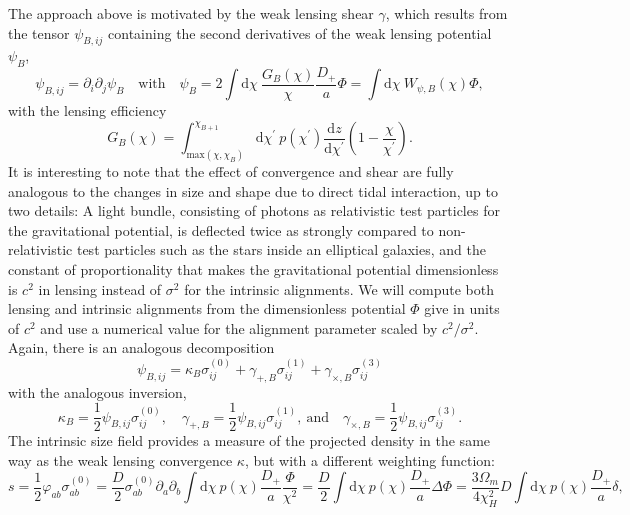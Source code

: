 \documentclass[a4paper,fleqn,usenatbib]{mnras}
\newcommand{\dd}{\mathrm{d}}
\begin{document}
The approach above is motivated by the weak lensing shear $\gamma$, which results from the tensor $\psi_{B,ij}$ containing the second derivatives of the weak lensing potential $\psi_B$,
\begin{equation}
\psi_{B,ij} = \partial_i\partial_j\psi_B
\quad\mathrm{with}\quad
\psi_B = 2\int\dd\chi\:\frac{G_B(\chi)}{\chi}\frac{D_+}{a}\Phi = \int\dd\chi\:W_{\psi,B}(\chi)\Phi,
\end{equation}
with the lensing efficiency
\begin{equation}
G_B(\chi) = \int_{\mathrm{max}(\chi,\chi_B)}^{\chi_{B+1}}\dd\chi^\prime\:p(\chi^\prime)\frac{\dd z}{\dd\chi^\prime}\left(1-\frac{\chi}{\chi^\prime}\right).
\end{equation}
It is interesting to note that the effect of convergence and shear are fully analogous to the changes in size and shape due to direct tidal interaction, up to two details: A light bundle, consisting of photons as relativistic test particles for the gravitational potential, is deflected twice as strongly compared to non-relativistic test particles such as the stars inside an elliptical galaxies, and the constant of proportionality that makes the gravitational potential dimensionless is $c^2$ in lensing instead of $\sigma^2$ for the intrinsic alignments. We will compute both lensing and intrinsic alignments from the dimensionless potential $\Phi$ give in units of $c^2$ and use a numerical value for the alignment parameter scaled by $c^2/\sigma^2$. Again, there is an analogous decomposition
\begin{equation}
\psi_{B,ij} = \kappa_B\sigma^{(0)}_{ij} + \gamma_{+,B}\sigma^{(1)}_{ij} +\gamma_{\times,B}\sigma^{(3)}_{ij}
\end{equation}
with the analogous inversion,
\begin{equation}
\kappa_B = \frac{1}{2}\psi_{B,ij}\sigma^{(0)}_{ij},
\quad
\gamma_{+,B} = \frac{1}{2}\psi_{B,ij}\sigma^{(1)}_{ij},
\mathrm{~and}\quad
\gamma_{\times,B} = \frac{1}{2}\psi_{B,ij}\sigma^{(3)}_{ij}.
\end{equation}
The intrinsic size field provides a measure of the projected density in the same way as the weak lensing convergence $\kappa$, but with a different weighting function:
\begin{equation}
s = 
\frac{1}{2}\varphi_{ab}\sigma^{(0)}_{ab} = 
\frac{D}{2}\sigma^{(0)}_{ab}\partial_a\partial_b\int\dd\chi\: p(\chi)\frac{D_+}{a}\frac{\Phi}{\chi^2} = 
\frac{D}{2}\int\dd\chi\:p(\chi)\frac{D_+}{a}\Delta\Phi = 
\frac{3\Omega_m}{4\chi_H^2}D\int\dd\chi\:p(\chi)\frac{D_+}{a}\delta,
\end{equation}
\end{document}
